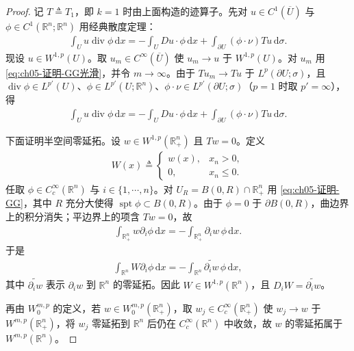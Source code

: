 \documentclass[../../main.tex]{subfiles}%
\begin{document}
\begin{proof}
记 $T\triangleq T_{1}$，即 $k=1$ 时由上面构造的迹算子。先对 $u\in C^{1}(\overline{U})$ 与 $\phi\in C^{1}(\mathbb{R}^{n};\mathbb{R}^{n})$ 用经典散度定理：
\begin{align}
\int_{U}u\operatorname{div}\phi\,\mathrm{d}x
=-\int_{U}Du\cdot\phi\,\mathrm{d}x
+\int_{\partial U}(\phi\cdot\nu)Tu\,\mathrm{d}\sigma.
\label{eq:ch05-证明-GG光滑}
\end{align}
现设 $u\in W^{1,p}(U)$。取 $u_{m}\in C^{\infty}(\overline{U})$ 使 $u_{m}\to u$ 于 $W^{1,p}(U)$。对 $u_{m}$ 用 \eqref{eq:ch05-证明-GG光滑}，并令 $m\to\infty$。由于 $Tu_{m}\to Tu$ 于 $L^{p}(\partial U;\sigma)$，且 $\operatorname{div}\phi\in L^{p'}(U)$、$\phi\in L^{p'}(U;\mathbb{R}^{n})$、$\phi\cdot\nu\in L^{p'}(\partial U;\sigma)$（$p=1$ 时取 $p'=\infty$），得
\begin{align}
\int_{U}u\operatorname{div}\phi\,\mathrm{d}x
=-\int_{U}Du\cdot\phi\,\mathrm{d}x
+\int_{\partial U}(\phi\cdot\nu)Tu\,\mathrm{d}\sigma.
\label{eq:ch05-证明-GG}
\end{align}

下面证明半空间零延拓。设 $w\in W^{1,p}(\mathbb{R}^{n}_{+})$ 且 $Tw=0$。定义
\begin{align*}
W(x)\triangleq
\begin{cases}
w(x), & x_{n}>0,\\
0, & x_{n}\leqslant0.
\end{cases}
\end{align*}
任取 $\phi\in C^{\infty}_{c}(\mathbb{R}^{n})$ 与 $i\in\{1,\cdots,n\}$。对 $U_{R}=B(0,R)\cap\mathbb{R}^{n}_{+}$ 用 \eqref{eq:ch05-证明-GG}，其中 $R$ 充分大使得 $\operatorname{spt}\phi\subset B(0,R)$。由于 $\phi=0$ 于 $\partial B(0,R)$，曲边界上的积分消失；平边界上的项含 $Tw=0$，故
\begin{align*}
\int_{\mathbb{R}^{n}_{+}}w\partial_{i}\phi\,\mathrm{d}x
=-\int_{\mathbb{R}^{n}_{+}}\partial_{i}w\,\phi\,\mathrm{d}x.
\end{align*}
于是
\begin{align}
\int_{\mathbb{R}^{n}}W\partial_{i}\phi\,\mathrm{d}x
=-\int_{\mathbb{R}^{n}}\widetilde{\partial_{i}w}\,\phi\,\mathrm{d}x,
\label{eq:ch05-证明-零延拓}
\end{align}
其中 $\widetilde{\partial_{i}w}$ 表示 $\partial_{i}w$ 到 $\mathbb{R}^{n}$ 的零延拓。因此 $W\in W^{1,p}(\mathbb{R}^{n})$，且 $D_{i}W=\widetilde{\partial_{i}w}$。

再由 $W^{m,p}_{0}$ 的定义，若 $w\in W^{m,p}_{0}(\mathbb{R}^{n}_{+})$，取 $w_{j}\in C^{\infty}_{c}(\mathbb{R}^{n}_{+})$ 使 $w_{j}\to w$ 于 $W^{m,p}(\mathbb{R}^{n}_{+})$，将 $w_{j}$ 零延拓到 $\mathbb{R}^{n}$ 后仍在 $C^{\infty}_{c}(\mathbb{R}^{n})$ 中收敛，故 $w$ 的零延拓属于 $W^{m,p}(\mathbb{R}^{n})$。


\end{proof}
\end{document}

